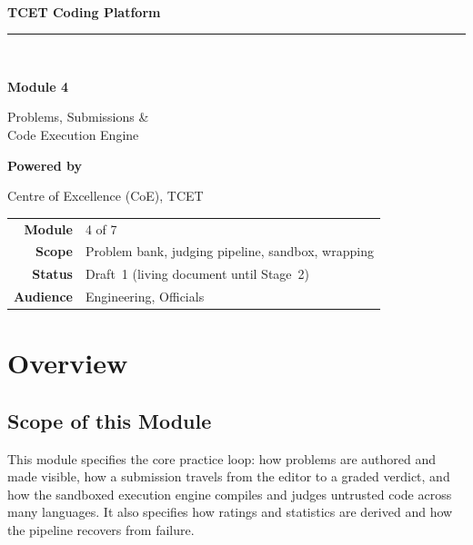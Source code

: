 \documentclass[12pt,a4paper,oneside]{report}
\begin{document}
\begin{titlepage}\centering
\vspace*{1.4cm}{\color{tcetaccent}\rule{\linewidth}{1.2pt}}\\[0.5cm]
{\LARGE\bfseries TCET Coding Platform\par}
{\color{tcetaccent}\rule{\linewidth}{1.2pt}}\\[1.4cm]
{\Huge\bfseries\color{tcetblue} Module 4\par}\vspace{0.3cm}
{\Huge Problems, Submissions \&\\[0.2cm] Code Execution Engine\par}\vspace{2.0cm}
{\large\bfseries Powered by\par}{\Large\color{tcetblue} Centre of Excellence (CoE), TCET\par}\vfill
\begin{tabular}{rl}\textbf{Module} & 4 of 7\\[3pt]
\textbf{Scope} & Problem bank, judging pipeline, sandbox, wrapping\\[3pt]
\textbf{Status} & Draft~1 (living document until Stage~2)\\[3pt]
\textbf{Audience} & Engineering, Officials\\\end{tabular}
\vspace{0.8cm}{\small\itshape \today\par}\end{titlepage}
\tableofcontents\clearpage{}

\chapter{Overview}
\section{Scope of this Module}
This module specifies the core practice loop: how problems are authored and made
visible, how a submission travels from the editor to a graded verdict, and how
the sandboxed execution engine compiles and judges untrusted code across many
languages. It also specifies how ratings and statistics are derived and how the
pipeline recovers from failure.
\end{document}
